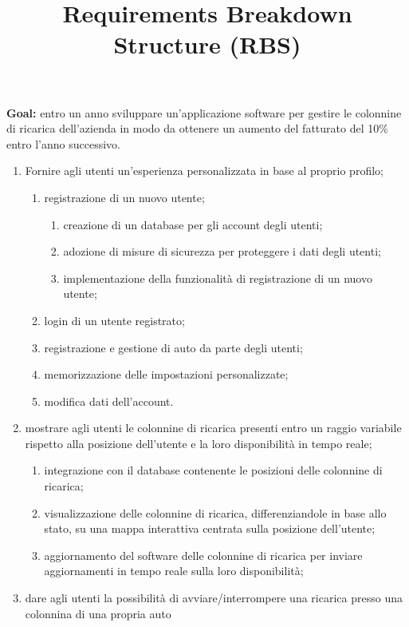 \documentclass[a4paper,12pt]{article}
\title{\textbf{Requirements Breakdown Structure (RBS)}}
\author{}
\date{}
\begin{document}
\maketitle

\textbf{Goal:} entro un anno sviluppare un'applicazione software per gestire le colonnine di ricarica dell'azienda in
modo da ottenere un aumento del fatturato del 10\% entro l'anno successivo.
\begin{enumerate}
    \item Fornire agli utenti un'esperienza personalizzata in base al proprio profilo;
    \begin{enumerate}
        \item registrazione di un nuovo utente;
        \begin{enumerate}
            \item creazione di un database per gli account degli utenti;
            \item adozione di misure di sicurezza per proteggere i dati degli utenti;
            \item implementazione della funzionalità di registrazione di un nuovo utente;
        \end{enumerate}
        \item login di un utente registrato;
        \item registrazione e gestione di auto da parte degli utenti;
        \item memorizzazione delle impostazioni personalizzate;
        \item modifica dati dell'account.
    \end{enumerate}
    \item mostrare agli utenti le colonnine di ricarica presenti entro un raggio variabile rispetto alla posizione
    dell'utente e la loro disponibilità in tempo reale;
    \begin{enumerate}
        \item integrazione con il database contenente le posizioni delle colonnine di ricarica;
        \item visualizzazione delle colonnine di ricarica, differenziandole in base allo stato, su una mappa
        interattiva centrata sulla posizione dell'utente;
        \item aggiornamento del software delle colonnine di ricarica per inviare aggiornamenti in tempo reale sulla
        loro disponibilità;
    \end{enumerate}
    \item dare agli utenti la possibilità di avviare/interrompere una ricarica presso una colonnina di una propria auto

\end{enumerate}
\end{document}
